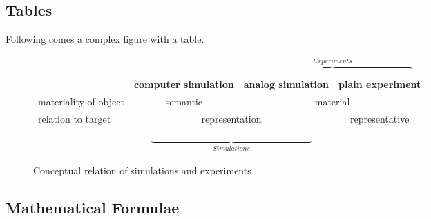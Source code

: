 \documentclass[12pt, english, a4paper]{article}
\begin{document}
\subsection{Tables}

Following comes a complex figure with a table.
\begin{figure}

\begin{center}
\begin{scriptsize}
\begin{tabular}{l|c|c|c|}
\multicolumn{1}{c}{ } & \multicolumn{1}{c}{ }     & \multicolumn{2}{c}{$\overbrace{\hspace{7cm}}^{Experiments}$} \\ \cline{2-4}
                      & {\bf computer simulation} & {\bf analog simulation} & {\bf plain experiment} \\ \hline
materiality of object
                      & semantic                  & \multicolumn{2}{c|}{material} \\ \hline
relation to target
                      & \multicolumn{2}{c|}{representation}                 & representative \\ \hline
\multicolumn{1}{c}{ } & \multicolumn{2}{c}{$\underbrace{\hspace{7cm}}_{Simulations}$} & \multicolumn{1}{c}{ } \\
\end{tabular}
\end{scriptsize}
\end{center}
\caption{Conceptual relation of simulations and experiments \citep[page needed]{Arnold2013}}\label{SimulationExperimentsScheme}

\end{figure}


\subsection{Mathematical Formulae}
\end{document}
